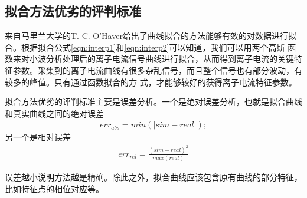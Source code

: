 \subsection{拟合方法优劣的评判标准}
来自马里兰大学的T. C. O'Haver给出了曲线拟合的方法\cite{tco_gs}能够有效的对数据进行拟合。根据拟合公式\ref{eqn:interp1}和\ref{eqn:interp2}可以知道，我们可以用两个高斯
函数来对小波分析处理后的离子电流信号曲线进行拟合，从而得到离子电流的关键特征参数。采集到的离子电流曲线有很多杂乱信号，而且整个信号也有部分波动，有较多的峰值。只有通过函数拟合的方
式，才能够较好的获得离子电流特征参数。\par
拟合方法优劣的评判标准主要是误差分析。一个是绝对误差分析，也就是拟合曲线和真实曲线之间的绝对误差
\begin{gather}
	err_{abs} = min(|sim-real|);
\end{gather}
另一个是相对误差
\begin{gather}
	err_{rel} = \frac{(sim-real)^2}{max(real)}
\end{gather}
\par
误差越小说明方法越是精确。除此之外，拟合曲线应该包含原有曲线的部分特征，比如特征点的相位对应等。




